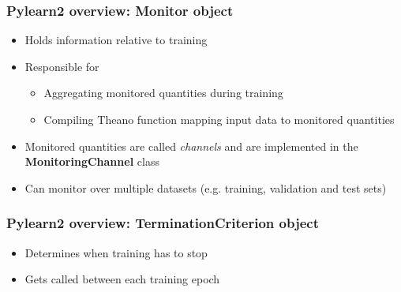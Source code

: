 \documentclass[mathserif, xcolor=dvipsnames]{beamer}
\begin{document}
\begin{frame}
    \frametitle{Pylearn2 overview: \textbf{Monitor} object}
    \begin{itemize}\addtolength{\itemsep}{0.5\baselineskip}
        \item{Holds information relative to training}
        \item{
            Responsible for
            \begin{itemize}\addtolength{\itemsep}{0.5\baselineskip}
                \large
                \item{Aggregating monitored quantities during training}
                \item{Compiling Theano function mapping input data to monitored
                      quantities}
            \end{itemize}
        }
    \item{Monitored quantities are called \emph{channels} and are implemented in
          the \textbf{MonitoringChannel} class}
    \item{Can monitor over multiple datasets (e.g. training, validation and test
          sets)}
    \end{itemize}

\end{frame}

\begin{frame}
    \frametitle{Pylearn2 overview: \textbf{TerminationCriterion} object}
    \Large
    \begin{itemize}\addtolength{\itemsep}{2.5\baselineskip}
        \item{Determines when training has to stop}
        \item{Gets called between each training epoch}
    \end{itemize}

\end{frame}
\end{document}

